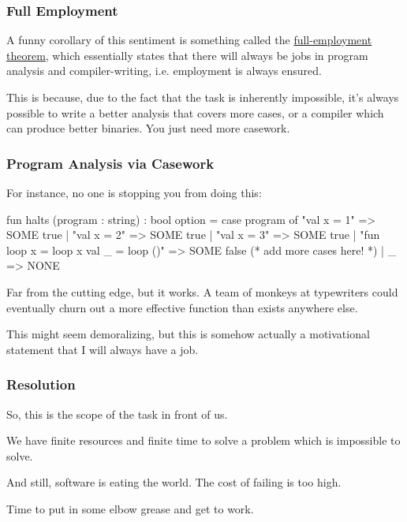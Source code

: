 \documentclass[aspectratio=169, handout]{beamer}
\begin{document}
\begin{frame}[fragile]
  \frametitle{Full Employment}

  A funny corollary of this sentiment is something called the
  {\color{blue}\href{https://en.wikipedia.org/wiki/Full-employment_theorem}{full-employment theorem}},
  which essentially states that there will always be jobs in program analysis and
  compiler-writing, i.e. employment is always ensured.

  \pause
  \vspace{\fill}

  This is because, due to the fact that the task is inherently impossible, it's
  always possible to write a better analysis that covers more cases, or a
  compiler which can produce better binaries. You just need more casework.
\end{frame}

\begin{frame}[fragile]
  \frametitle{Program Analysis via Casework}

  For instance, no one is stopping you from doing this:
  \pause
  \begin{codeblock}
    fun halts (program : string) : bool option =
      case program of
        "val x = 1" => SOME true
      | "val x = 2" => SOME true
      | "val x = 3" => SOME true
      | "fun loop x = loop x val _ = loop ()" => SOME false
      (* add more cases here! *)
      | _ => NONE
  \end{codeblock}

  \pause
  \vspace{\fill}

  Far from the cutting edge, but it works. A team of monkeys at typewriters
  could eventually churn out a more effective  function than
  exists anywhere else.

  \pause
  \vspace{\fill}

  This might seem demoralizing, but this is somehow actually a motivational
  statement that I will always have a job.
\end{frame}

\begin{frame}[fragile]
  \frametitle{Resolution}

  So, this is the scope of the task in front of us.

  \pause
  \vspace{\fill}

  We have finite resources and finite time to solve a problem which is
  impossible to solve.

  \pause
  \vspace{\fill}

  And still, software is eating the world. The cost of failing is too high.

  \pause
  \vspace{\fill}

  Time to put in some elbow grease and get to work.
\end{frame}
\end{document}
